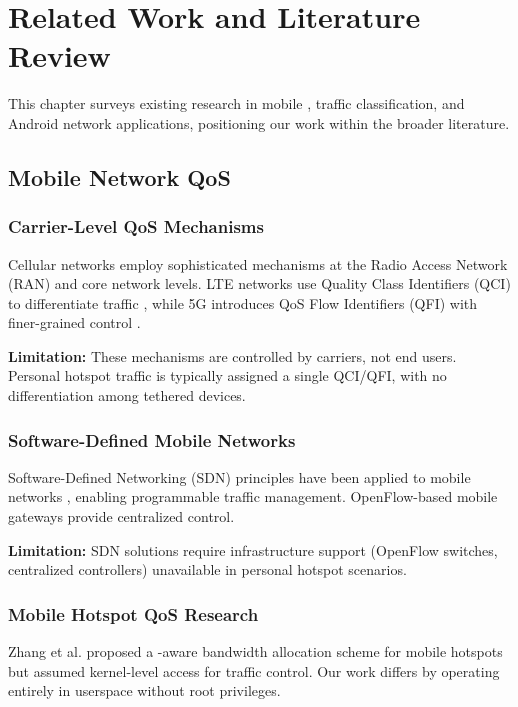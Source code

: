 \chapter{Related Work and Literature Review}
\label{ch:related-work}

This chapter surveys existing research in mobile \qos, traffic classification, and Android network applications, positioning our work within the broader literature.

\section{Mobile Network QoS}

\subsection{Carrier-Level QoS Mechanisms}

Cellular networks employ sophisticated \qos mechanisms at the Radio Access Network (RAN) and core network levels. LTE networks use Quality Class Identifiers (QCI) to differentiate traffic \cite{3gpp2011qos}, while 5G introduces QoS Flow Identifiers (QFI) with finer-grained control \cite{3gpp2018nr}.

\textbf{Limitation:} These mechanisms are controlled by carriers, not end users. Personal hotspot traffic is typically assigned a single QCI/QFI, with no differentiation among tethered devices.

\subsection{Software-Defined Mobile Networks}

Software-Defined Networking (SDN) principles have been applied to mobile networks \cite{pentikousis2013mobileflow}, enabling programmable traffic management. OpenFlow-based mobile gateways \cite{jin2013softcell} provide centralized \qos control.

\textbf{Limitation:} SDN solutions require infrastructure support (OpenFlow switches, centralized controllers) unavailable in personal hotspot scenarios.

\subsection{Mobile Hotspot QoS Research}

Zhang et al. \cite{zhang2013qos} proposed a \qos-aware bandwidth allocation scheme for mobile hotspots but assumed kernel-level access for traffic control. Our work differs by operating entirely in userspace without root privileges.

